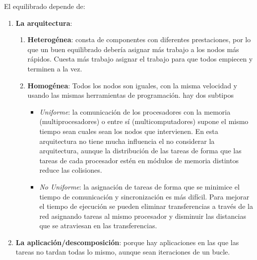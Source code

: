 \documentclass[10pt,a4paper,spanish]{report}
\begin{document}
El equilibrado depende de:
\begin{enumerate}[\color{azul}{\bf $\heartsuit$}]
    \item \textcolor[rgb]{0.2,0.4,0.8}{\textbf{La arquitectura}}:
    \begin{enumerate}[$\longrightarrow$]
        \item \textcolor[rgb]{0.2,0.4,0.8}{\textbf{Heterogénea}}: consta de componentes con diferentes prestaciones, por lo que un buen equilibrado debería asignar más trabajo a los nodos más rápidos. Cuesta más trabajo asignar el trabajo para que todos empiecen y terminen a la vez.
        \item \textcolor[rgb]{0.2,0.4,0.8}{\textbf{Homogénea}}: Todos los nodos son iguales, con la misma velocidad y usando las mismas herramientas de programación. hay dos subtipos
        \begin{itemize}
            \item \textit{\textcolor[rgb]{0.2,0.4,0.8}{Uniforme}}: la comunicación de los procesadores con la memoria (multiprocesadores) o entre sí (multicomputadores) supone el mismo tiempo sean cuales sean los nodos que intervienen. En esta arquitectura no tiene mucha influencia el no considerar la arquitectura, aunque la distribución de las tareas de forma que las tareas de cada procesador estén en módulos de memoria distintos reduce las colisiones.
            \item \textcolor[rgb]{0.2,0.4,0.8}{\textit{No Uniforme}}: la asignación de tareas de forma que se minimice el tiempo de comunicación y sincronización es más difícil. Para mejorar el tiempo de ejecución se pueden eliminar transferencias a través de la red asignando tareas al mismo procesador y disminuir las distancias que se atraviesan en las transferencias.
        \end{itemize}
    \end{enumerate}
    \item \textcolor[rgb]{0.2,0.4,0.8}{\textbf{La aplicación/descomposición}}: porque hay aplicaciones en las que las tareas no tardan todas lo mismo, aunque sean iteraciones de un bucle.
\end{enumerate}
\end{document}
